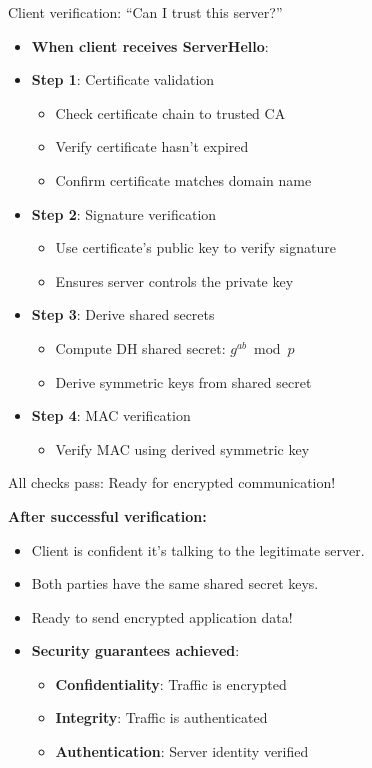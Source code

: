 \documentclass[aspectratio=169, lualatex, handout]{beamer}
\begin{document}
\begin{frame}{Client verification: ``Can I trust this server?''}
	\begin{itemize}[<+->]
		\item \textbf{When client receives ServerHello}:
		\item \textbf{Step 1}: Certificate validation
		      \begin{itemize}
			      \item Check certificate chain to trusted CA
			      \item Verify certificate hasn't expired
			      \item Confirm certificate matches domain name
		      \end{itemize}
		\item \textbf{Step 2}: Signature verification
		      \begin{itemize}
			      \item Use certificate's public key to verify signature
			      \item Ensures server controls the private key
		      \end{itemize}
		\item \textbf{Step 3}: Derive shared secrets
		      \begin{itemize}
			      \item Compute DH shared secret: $g^{ab} \bmod p$
			      \item Derive symmetric keys from shared secret
		      \end{itemize}
		\item \textbf{Step 4}: MAC verification
		      \begin{itemize}
			      \item Verify MAC using derived symmetric key
		      \end{itemize}
	\end{itemize}
\end{frame}

\begin{frame}{All checks pass: Ready for encrypted communication!}
	\begin{center}
		\textbf{After successful verification:}
	\end{center}
	\begin{itemize}[<+->]
		\item Client is confident it's talking to the legitimate server.
		\item Both parties have the same shared secret keys.
		\item Ready to send encrypted application data!
		\item \textbf{Security guarantees achieved}:
		      \begin{itemize}
			      \item \textbf{Confidentiality}: Traffic is encrypted
			      \item \textbf{Integrity}: Traffic is authenticated
			      \item \textbf{Authentication}: Server identity verified
		      \end{itemize}
	\end{itemize}
\end{frame}
\end{document}
